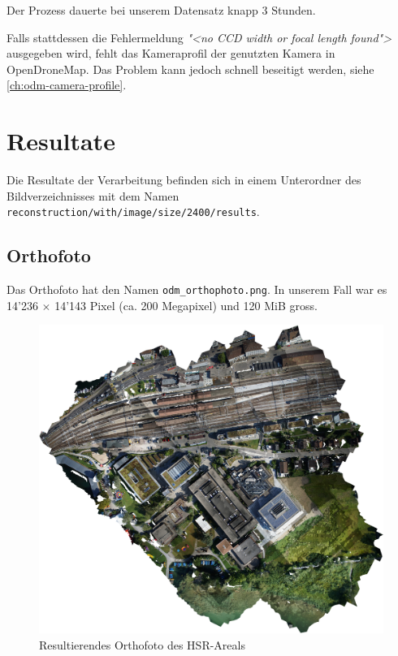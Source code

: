 \noindent Der Prozess dauerte bei unserem Datensatz knapp 3 Stunden.

Falls stattdessen die Fehlermeldung \textit{"<no CCD width or focal length
found">} ausgegeben wird, fehlt das Kameraprofil der genutzten Kamera in
OpenDroneMap.  Das Problem kann jedoch schnell beseitigt werden, siehe
\autoref{ch:odm-camera-profile}.


\section{Resultate}

Die Resultate der Verarbeitung befinden sich in einem Unterordner des
Bildverzeichnisses mit dem Namen
\texttt{reconstruction\-/with\-/image\-/size\-/2400\-/results}.

\subsection{Orthofoto}

Das Orthofoto hat den Namen \texttt{odm\_orthophoto.png}. In unserem Fall war es
14'236 $\times$ 14'143 Pixel (ca. 200 Megapixel) und 120 MiB gross.

\begin{figure}[H]
	\centering
	\includegraphics[width=\textwidth]{images/odm_orthophoto}
	\caption{Resultierendes Orthofoto des HSR-Areals}
	\label{img:odm_orthophoto}
\end{figure}

